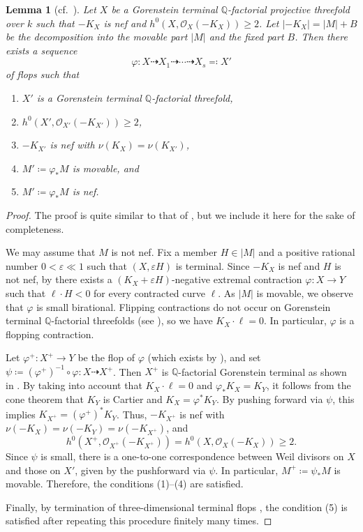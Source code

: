 \documentclass[12pt]{amsart}
\def\phi{\varphi}
\def\epsilon{\varepsilon}
\newcommand{\Q}{\mathbb{Q}}
\newcommand{\sO}{\mathcal{O}}
\theoremstyle{plain}
\newtheorem{lem}[thm]{Lemma}
\theoremstyle{definition}
\theoremstyle{remark}
\newtheorem{defn and notation}[thm]{Definition and Notation}
\theoremstyle{plain}
\begin{document}
\begin{lem}[\textup{cf.~\cite[Proposition 4.1]{Xie20}}]\label{lem:flip}
    Let $X$ be a Gorenstein terminal $\Q$-factorial projective threefold over $k$ such that $-K_X$ is nef and $h^0(X,\sO_X(-K_X))\geq 2$.
    Let $|-K_X|=|M|+B$ be the decomposition into the movable part $|M|$ and the fixed part $B$.
    Then there exists a sequence 
    \[
    \phi\colon X\dasharrow X_1 \dasharrow\cdots \dasharrow X_s \eqqcolon X' 
    \]
    of flops such that
    \begin{enumerate}[label=\textup{(\arabic*)}]
        \item $X'$ is a Gorenstein terminal $\Q$-factorial threefold,
        \item $h^0(X',\sO_{X'}(-K_{X'}))\geq 2$,
        \item $-K_{X'}$ is nef with $\nu(K_X)=\nu(K_{X'})$, 
        \item $M'\coloneqq \phi_{*}M$ is movable, and
        \item $M'\coloneqq \phi_{*}M$ is nef.
    \end{enumerate}
\end{lem}
\begin{proof}
The proof is quite similar to that of \cite[Proposition 4.1]{Xie20}, but we include it here for the sake of completeness. 

    We may assume that $M$ is not nef.
    Fix a member $H\in |M|$ and a positive rational number $0< \epsilon \ll 1$ such that $(X, \epsilon H)$ is terminal.
    Since $-K_X$ is nef and $H$ is not nef, by \cite[Lemma 2.5]{Xie20} there exists a $(K_X+\epsilon H)$-negative extremal contraction $\phi\colon X\to Y$ such that $\ell \cdot H<0$ for every contracted curve $\ell$.
    As $|M|$ is movable, we observe that $\phi$ is small birational.
    Flipping contractions do not occur on Gorenstein terminal $\Q$-factorial threefolds (see \cite[Th\'eor\`em 0]{Benveniste}), so we have $K_X\cdot \ell=0$.
    In particular, $\phi$ is a flopping contraction.
    
    Let $\phi^{+}\colon X^{+}\to Y$ be the flop of $\phi$ (which exists by \cite[Theorem 6.14]{KM98}), and set $\psi \coloneqq (\phi^{+})^{-1}\circ \phi \colon X\dasharrow X^{+}$.
    Then $X^{+}$ is $\Q$-factorial Gorenstein terminal as shown in \cite[Theorem 6.15]{KM98}.
    By taking into account that $K_X\cdot \ell=0$ and $\phi_{*}K_X=K_Y$, it follows from the cone theorem \cite[Theorem 3.7]{KM98} that $K_Y$ is Cartier and $K_X=\phi^{*}K_Y$. 
    By pushing forward via $\psi$, this implies $K_{X^{+}}=(\phi^{+})^{*}K_{Y}$. 
    Thus, $-K_{X^{+}}$ is nef with $\nu(-K_X)=\nu( -K_Y)=\nu( -K_{X^{+}})$,  and 
    \[
    h^0(X^{+},\sO_{X^{+}}(-K_{X^{+}}))=h^0(X,\sO_X(-K_X))\geq 2.
    \]
    Since $\psi$ is small, there is a one-to-one correspondence between Weil divisors on $X$ and those on $X'$, given by the pushforward via $\psi$.
    In particular, 
   $M^{+}\coloneqq \psi_{*}M$ is movable.
   Therefore, the conditions (1)--(4) are satisfied.

   Finally, by  termination of three-dimensional terminal flops \cite[Corollary 6.19]{KM98}, the condition (5) is satisfied after repeating this procedure finitely many times.
\end{proof}
\end{document}
